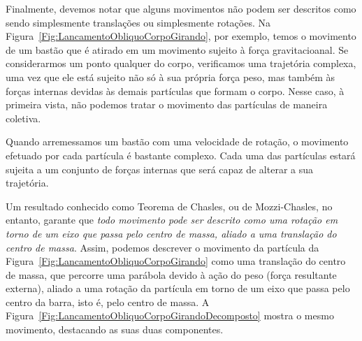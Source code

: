 Finalmente, devemos notar que alguns movimentos não podem ser descritos como sendo simplesmente translações ou simplesmente rotações. Na  Figura~\ref{Fig:LancamentoObliquoCorpoGirando}, por exemplo, temos o movimento de um bastão que é atirado em um movimento sujeito à força gravitacioanal. Se considerarmos um ponto qualquer do corpo, verificamos uma trajetória complexa, uma vez que ele está sujeito não só à sua própria força peso, mas também às forças internas devidas às demais partículas que formam o corpo. Nesse caso, à primeira vista, não podemos tratar o movimento das partículas de maneira coletiva.

\begin{marginfigure}
\centering
{}
\caption{Quando arremessamos um bastão com uma velocidade de rotação, o movimento efetuado por cada partícula é bastante complexo. Cada uma das partículas estará sujeita a um conjunto de forças internas que será capaz de alterar a sua trajetória. \label{Fig:LancamentoObliquoCorpoGirando}}
\end{marginfigure}

Um resultado conhecido como Teorema de Chasles, ou de Mozzi-Chasles, no entanto, garante que \emph{todo movimento pode ser descrito como uma rotação em torno de um eixo que passa pelo centro de massa, aliado a uma translação do centro de massa}. Assim, podemos descrever o movimento da partícula da Figura~\ref{Fig:LancamentoObliquoCorpoGirando} como uma translação do centro de massa, que percorre uma parábola devido à ação do peso (força resultante externa), aliado a uma rotação da partícula em torno de um eixo que passa pelo centro da barra, isto é, pelo centro de massa. A Figura~\ref{Fig:LancamentoObliquoCorpoGirandoDecomposto} mostra o mesmo movimento, destacando as suas duas componentes.

